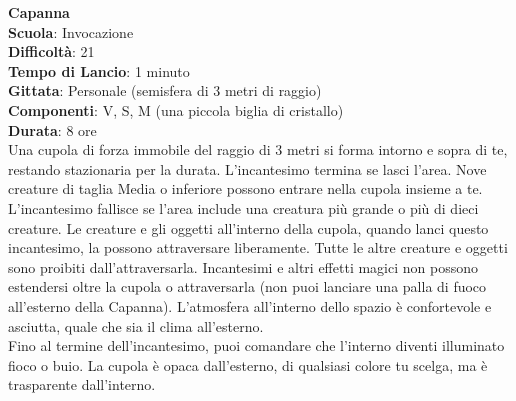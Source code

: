 \begin{multicols}{2}
\medskip\textbf{Capanna}\\
\textbf{Scuola}: Invocazione\\
\textbf{Difficoltà}: 21\\
\textbf{Tempo di Lancio}: 1 minuto\\
\textbf{Gittata}: Personale (semisfera di 3 metri di raggio)\\
\textbf{Componenti}: V, S, M (una piccola biglia di cristallo)\\
\textbf{Durata}: 8 ore\\
Una cupola di forza immobile del raggio di 3 metri si forma intorno e sopra di te, restando stazionaria per la durata. L'incantesimo termina se lasci l'area. Nove creature di taglia Media o inferiore possono entrare nella cupola insieme a te. L'incantesimo fallisce se l'area include una creatura più grande o più di dieci creature. Le creature e gli oggetti all'interno della cupola, quando lanci questo incantesimo, la possono attraversare liberamente. Tutte le altre creature e oggetti sono proibiti dall'attraversarla. Incantesimi e altri effetti magici non possono estendersi oltre la cupola o attraversarla (non puoi lanciare una palla di fuoco all'esterno della Capanna). L'atmosfera all'interno dello spazio è confortevole e asciutta, quale che sia il clima all'esterno.\\
Fino al termine dell'incantesimo, puoi comandare che l'interno diventi illuminato fioco o buio. La cupola è opaca dall'esterno, di qualsiasi colore tu scelga, ma è trasparente dall'interno. 


\end{multicols}
